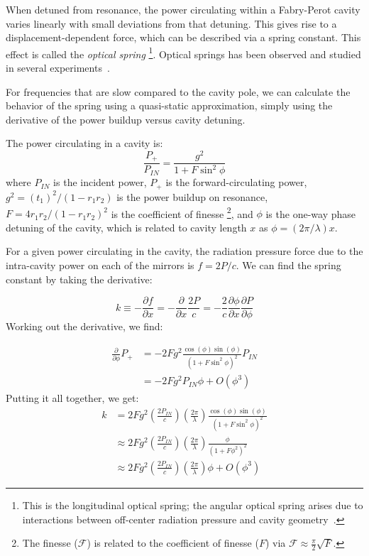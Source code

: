 When detuned from resonance, the power circulating within a Fabry-Perot
cavity varies linearly with small deviations from that detuning. This
gives rise to a displacement-dependent force, which can be described
via a spring constant. This effect is called the \emph{optical spring}
\footnote{This is the longitudinal optical spring; the angular optical spring
arises due to interactions between off-center radiation pressure and cavity geometry~\cite{Sidles2006Optical}.}.  Optical springs has been observed and studied in several experiments~\cite{Sheard2004Observation}.

For frequencies that are slow compared to the cavity pole, we can
calculate the behavior of the spring using a quasi-static approximation,
simply using the derivative of the power buildup versus cavity detuning.

The power circulating in a cavity is:
\begin{equation}
\frac{P_{+}}{P_{IN}}=\frac{g^{2}}{1+F\sin^{2}\phi}
\end{equation}
where $P_{IN}$ is the incident power, $P_{+}$ is the forward-circulating
power, $g^{2}=\left(t_{1}\right)^{2}/\left(1-r_{1}r_{2}\right)$ is
the power buildup on resonance, $F=4r_{1}r_{2}/\left(1-r_{1}r_{2}\right)^{2}$
is the coefficient of finesse%
\footnote{The finesse ($\mathcal{F}$) is related to the coefficient of finesse
($F$) via $\mathcal{F}\approx\frac{\pi}{2}\sqrt{F}$.%
}, and $\phi$ is the one-way phase detuning of the cavity, which is
related to cavity length $x$ as $\phi=(2\pi/\lambda)x$. 

For a given power circulating in the cavity, the radiation pressure
force due to the intra-cavity power on each of the mirrors is $f=2P/c$.
We can find the spring constant by taking the derivative:

\[
k\equiv-\frac{\partial f}{\partial x}=-\frac{\partial}{\partial x}\frac{2P}{c}=-\frac{2}{c}\frac{\partial\phi}{\partial x}\frac{\partial P}{\partial\phi}
\]
Working out the derivative, we find:

\begin{align}
\frac{\partial}{\partial\phi}P_{+} & =-2Fg^{2}\frac{\cos(\phi)\sin(\phi)}{\left(1+F\sin^{2}\phi\right)^{2}}P_{IN}\\
 & =-2Fg^{2}P_{IN}\phi+O\left(\phi^{3}\right)
\end{align}
Putting it all together, we get:
\begin{align}
k & =2Fg^{2}\left(\frac{2P_{IN}}{c}\right)\left(\frac{2\pi}{\lambda}\right)\frac{\cos(\phi)\sin(\phi)}{\left(1+F\sin^{2}\phi\right)^{2}}\label{eq:spring-constant}\\
 & \approx2Fg^{2}\left(\frac{2P_{IN}}{c}\right)\left(\frac{2\pi}{\lambda}\right)\frac{\phi}{\left(1+F\phi^{2}\right)^{2}}\label{eq:spring-constant-approx1}\\
 & \approx2Fg^{2}\left(\frac{2P_{IN}}{c}\right)\left(\frac{2\pi}{\lambda}\right)\phi+O\left(\phi^{3}\right)
\end{align}


